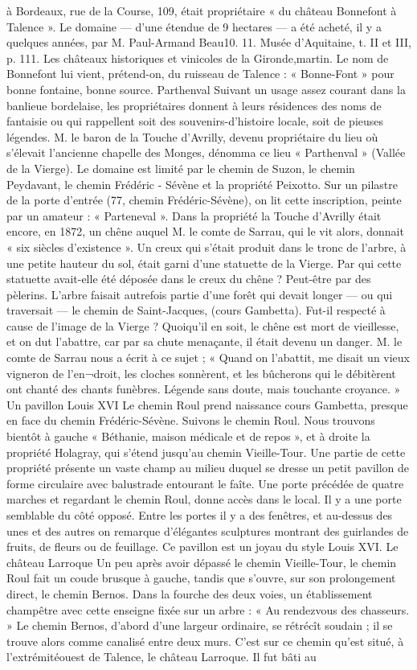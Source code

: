 à Bordeaux, rue de la Course, 109, était propriétaire « du château Bonnefont à Talence ». Le domaine — d'une étendue de 9 hectares — a été acheté, il y a quelques années, par M. Paul-Armand Beau10. 11. Musée d'Aquitaine, t. II et III, p. 111. Les châteaux historiques et vinicoles de la Gironde,martin. Le nom de Bonnefont lui vient, prétend-on, du ruisseau de Talence : « Bonne-Font » pour bonne fontaine, bonne source. Parthenval Suivant un usage assez courant dans la banlieue bordelaise, les propriétaires donnent à leurs résidences des noms de fantaisie ou qui rappellent soit des souvenirs-d'histoire locale, soit de pieuses légendes. M. le baron de la Touche d'Avrilly, devenu propriétaire du lieu où s'élevait l'ancienne chapelle des Monges, dénomma ce lieu « Parthenval » (Vallée de la Vierge). Le domaine est limité par le chemin de Suzon, le chemin Peydavant, le chemin Frédéric - Sévène et la propriété Peixotto. Sur un pilastre de la porte d'entrée (77, chemin Frédéric-Sévène), on lit cette inscription, peinte par un amateur : « Parteneval ». Dans la propriété la Touche d'Avrilly était encore, en 1872, un chêne auquel M. le comte de Sarrau, qui le vit alors, donnait « six siècles d'existence ». Un creux qui s'était produit dans le tronc de l'arbre, à une petite hauteur du sol, était garni d'une statuette de la Vierge. Par qui cette statuette avait-elle été déposée dans le creux du chêne ? Peut-être par des pèlerins. L'arbre faisait autrefois partie d'une forêt qui devait longer — ou qui traversait — le chemin de Saint-Jacques, (cours Gambetta). Fut-il respecté à cause de l'image de la Vierge ? Quoiqu'il en soit, le chêne est mort de vieillesse, et on dut l'abattre, car par sa chute menaçante, il était devenu un danger. M. le comte de Sarrau nous a écrit à ce sujet ; « Quand on l'abattit, me disait un vieux vigneron de l'en¬droit, les cloches sonnèrent, et les bûcherons qui le débitèrent ont chanté des chants funèbres. Légende sans doute, mais touchante croyance. » Un pavillon Louis XVI Le chemin Roul prend naissance cours Gambetta, presque en face du chemin Frédéric-Sévène. Suivons le chemin Roul. Nous trouvons bientôt à gauche « Béthanie, maison médicale et de repos », et à droite la propriété Holagray, qui s'étend jusqu'au chemin Vieille-Tour. Une partie de cette propriété présente un vaste champ au milieu duquel se dresse un petit pavillon de forme circulaire avec balustrade entourant le faîte. Une porte précédée de quatre marches et regardant le chemin Roul, donne accès dans le local. Il y a une porte semblable du côté opposé. Entre les portes il y a des fenêtres, et au-dessus des unes et des autres on remarque d'élégantes sculptures montrant des guirlandes de fruits, de fleurs ou de feuillage. Ce pavillon est un joyau du style Louis XVI. Le château Larroque Un peu après avoir dépassé le chemin Vieille-Tour, le chemin Roul fait un coude brusque à gauche, tandis que s'ouvre, sur son prolongement direct, le chemin Bernos. Dans la fourche des deux voies, un établissement champêtre avec cette enseigne fixée sur un arbre : « Au rendezvous des chasseurs. » Le chemin Bernos, d'abord d'une largeur ordinaire, se rétrécît soudain ; il se trouve alors comme canalisé entre deux murs. C'est sur ce chemin qu'est situé, à l'extrémitéouest de Talence, le château Larroque. Il fut bâti au 
